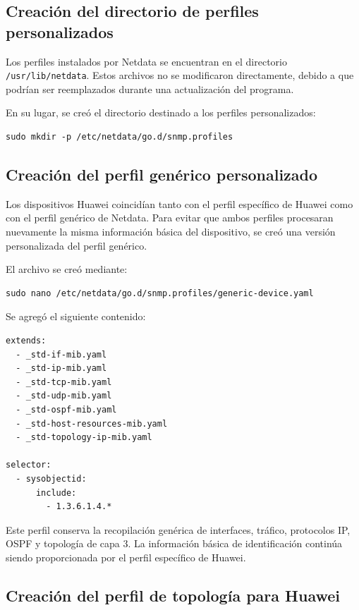 \subsection{Creación del directorio de perfiles personalizados}

Los perfiles instalados por Netdata se encuentran en el directorio \texttt{/usr/lib/netdata}. Estos archivos no se modificaron directamente, debido a que podrían ser reemplazados durante una actualización del programa.

En su lugar, se creó el directorio destinado a los perfiles personalizados:

\begin{lstlisting}[style=terminal]
sudo mkdir -p /etc/netdata/go.d/snmp.profiles
\end{lstlisting}

\subsection{Creación del perfil genérico personalizado}

Los dispositivos Huawei coincidían tanto con el perfil específico de Huawei como con el perfil genérico de Netdata. Para evitar que ambos perfiles procesaran nuevamente la misma información básica del dispositivo, se creó una versión personalizada del perfil genérico.

El archivo se creó mediante:

\begin{lstlisting}[style=terminal]
sudo nano /etc/netdata/go.d/snmp.profiles/generic-device.yaml
\end{lstlisting}

Se agregó el siguiente contenido:

\begin{lstlisting}[style=terminal]
extends:
  - _std-if-mib.yaml
  - _std-ip-mib.yaml
  - _std-tcp-mib.yaml
  - _std-udp-mib.yaml
  - _std-ospf-mib.yaml
  - _std-host-resources-mib.yaml
  - _std-topology-ip-mib.yaml

selector:
  - sysobjectid:
      include:
        - 1.3.6.1.4.*
\end{lstlisting}

Este perfil conserva la recopilación genérica de interfaces, tráfico, protocolos IP, OSPF y topología de capa 3. La información básica de identificación continúa siendo proporcionada por el perfil específico de Huawei.

\subsection{Creación del perfil de topología para Huawei}

